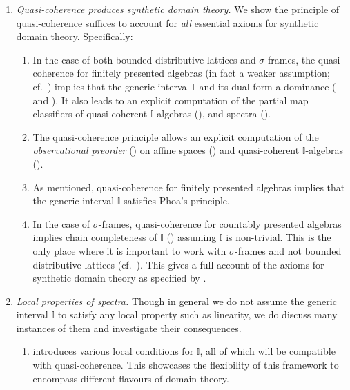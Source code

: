 \documentclass[a4paper,12pt]{amsart}
\theoremstyle{definition}
\newcommand{\mbb}[1]{\mathbb{#1}}
\newcommand{\I}{\mbb I}
\begin{document}
\begin{enumerate}[leftmargin=*]
  \item \emph{Quasi-coherence produces synthetic domain theory.} We show the principle of quasi-coherence suffices to account for \emph{all} essential axioms for synthetic domain theory. Specifically:
  \begin{enumerate}
    \item\label{contribution:dominance} In the case of both bounded distributive lattices and $\sigma$-frames, the quasi-coherence for finitely presented algebras (in fact a weaker assumption; cf.\ ) implies that the generic interval $\I$ and its dual form a dominance ( and ). It also leads to an explicit computation of the partial map classifiers of quasi-coherent $\I$-algebras (), and spectra ().
    \item The quasi-coherence principle allows an explicit computation of the \emph{observational preorder} () on affine spaces () and quasi-coherent $\I$-algebras ().
    \item As mentioned, quasi-coherence for finitely presented algebras implies that the generic interval $\I$ satisfies Phoa's principle. %
    \item In the case of $\sigma$-frames, quasi-coherence for countably presented algebras implies chain completeness of $\I$ () assuming $\I$ is non-trivial. 
    This is the only place where it is important to work with $\sigma$-frames and not bounded distributive lattices (cf.~). This gives a full account of the axioms for synthetic domain theory as specified by \citet{hyland1990first}. 
  \end{enumerate}

  \item \emph{Local properties of spectra.} Though in general we do not assume the generic interval $\I$ to satisfy any local property such as linearity, we do discuss many instances of them and investigate their consequences.
  \begin{enumerate}

    \item {} introduces various local conditions for $\I$, all of which will be compatible with quasi-coherence. This showcases the flexibility of this framework to encompass different flavours of domain theory.


\end{enumerate}
\end{enumerate}
\end{document}
